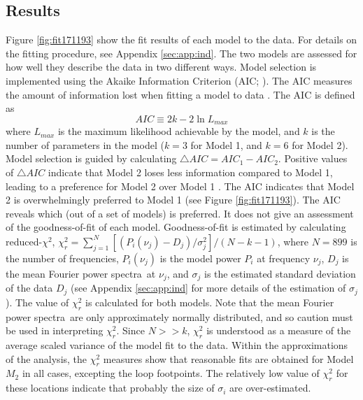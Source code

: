 \documentclass[onecolumn]{emulateapj}
\newcommand{\PA}{power spectra}
\newcommand{\mFpa}{mean Fourier \PA}
\newcommand{\BF}{ }
\begin{document}
\subsection{Results}\label{ssec:results}
Figure \ref{fig:fit171193} show the fit results of each model to the
data.  For details on the fitting procedure, see Appendix
\ref{sec:app:ind}.
{\BF The two models are assessed for how well they describe the data in two
different ways. Model selection is implemented using the Akaike Information Criterion
(AIC; \citealp*{akaike}).  The AIC measures the amount of information
lost when fitting a model to data \citep{2000Ap&SS.271..213T}.  The
AIC is defined as
\begin{equation}\label{eqn:aic}
AIC \equiv 2k -2 \ln L_{max}
\end{equation}
where $L_{max}$ is the maximum likelihood achievable by the model, and
$k$ is the number of parameters in the model ($k=3$ for Model 1, and
$k=6$ for Model 2).  Model selection is guided by calculating
$\triangle AIC = AIC_{1} - AIC_{2}$.  Positive values of $\triangle
AIC$ indicate that Model 2 loses less information compared to Model 1,
leading to a preference for Model 2 over Model 1
\citep{2007MNRAS.377L..74L}.  The AIC indicates that Model 2 is
overwhelmingly preferred to Model 1 (see Figure \ref{fig:fit171193}).}
{\BF The AIC reveals which (out of a set of models) is preferred.  It
  does not give an assessment of the goodness-of-fit of each model.
  Goodness-of-fit is estimated by calculating reduced-$\chi^{2}$,
  $\chi^{2}_{r}=\sum_{j=1}^{N}\left[(P_{i}(\nu_{j})-D_{j})/\sigma_{j}^{2}\right]/(N-k-1)$,
  where $N=899$ is the number of frequencies, $P_{i}(\nu_{j})$ is the
  model power $P_{i}$ at frequency $\nu_{j}$, $D_{j}$ is the \mFpa\ at
  $\nu_{j}$, and $\sigma_{j}$ is the estimated standard deviation of
  the data $D_{j}$ (see Appendix \ref{sec:app:ind} for more details of
  the estimation of $\sigma_{j}$).  The value of $\chi^{2}_{r}$ is
  calculated for both models.  Note that the \mFpa\ are only
  approximately normally distributed, and so caution must be used in
  interpreting $\chi^{2}_{r}$. Since $N>>k$, $\chi^{2}_{r}$ is
  understood as a measure of the average scaled variance of the model
  fit to the data. Within the approximations of the analysis, the
  $\chi^{2}_{r}$ measures show that reasonable fits are obtained for
  Model $M_{2}$ in all cases, excepting the loop footpoints.  The
  relatively low value of $\chi^{2}_{r}$ for these locations indicate
  that probably the size of $\sigma_{i}$ are over-estimated.}
\end{document}
